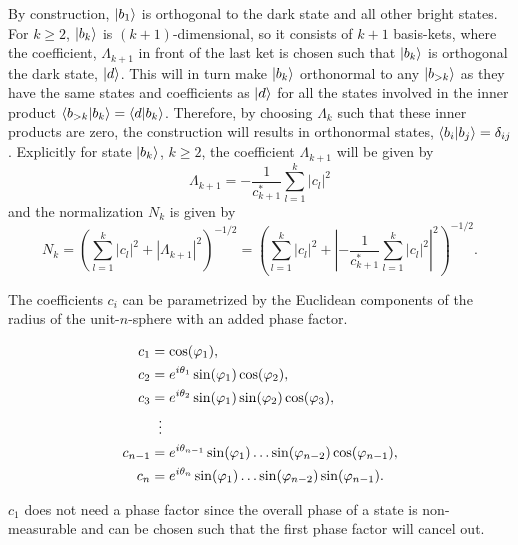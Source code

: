 By construction,  $\ket{b_1}$ is orthogonal to the dark state and all other bright states. For $k \geq 2$, $\ket{b_k}$ is $(k+1)$-dimensional, so it consists of $k+1$ basis-kets, where the coefficient, $\Lambda_{k+1}$ in front of the last ket is chosen such that $\ket{b_k}$ is orthogonal the dark state, $\ket{d}$. This will in turn make $\ket{b_k}$ orthonormal to any $\ket{b_{>k}}$ as they have the same states and coefficients as $\ket{d}$ for all the states involved in the inner product $\bra{b_{>k}}\ket{b_k} = \bra{d}\ket{b_k}$. Therefore, by choosing $\Lambda_k$ such that these inner products are zero, the construction will results in orthonormal states,  $\bra{b_i}\ket{b_j} = \delta_{ij}$. Explicitly for state $\ket{b_{k}}$, $k \geq 2$, the coefficient $\Lambda_{k+1}$ will be given by 
\begin{equation}
\Lambda_{k+1} = -\dfrac{1}{c_{k+1}^{*}}\sum_{l = 1}^{k}|c_l|^2
\end{equation}
and the normalization $N_{k}$ is given by 
\begin{equation}
N_k =  \left( \sum_{l = 1}^k|c_l|^2  + \left|\Lambda_{k+1}\right|^2 \right)^{-1/2} = \left( \sum_{l = 1}^k|c_l|^2  + \left|-\frac{1}{c_{k+1}^{*}}\sum_{l = 1}^{k} |c_l|^2 \right|^2 \right)^{-1/2}.
\end{equation}

The coefficients $c_i$ can be parametrized by the Euclidean components of the radius of the unit-$n$-sphere with an added phase factor.

\begin{equation}
\begin{aligned}
c_1 &= \cos(\varphi_1),
\\ 
c_2 &= e^{i\theta_1}\sin(\varphi_1)\cos(\varphi_2),
\\ 
c_3 &= e^{i\theta_2}\sin(\varphi_1)\sin(\varphi_2)\cos(\varphi_3),
\\
&\hspace{2mm}\vdots
\\
c_{n-1} &= e^{i\theta_{n-1}}\sin(\varphi_1)\dots\sin(\varphi_{n-2})\cos(\varphi_{n-1}),
\\
c_{n} &= e^{i\theta_{n}}\sin(\varphi_1)\dots\sin(\varphi_{n-2})\sin(\varphi_{n-1}).
\end{aligned}
\end{equation}

\noindent$c_1$ does not need a phase factor since the overall phase of a state is non-measurable and can be chosen such that the first phase factor will cancel out. 

